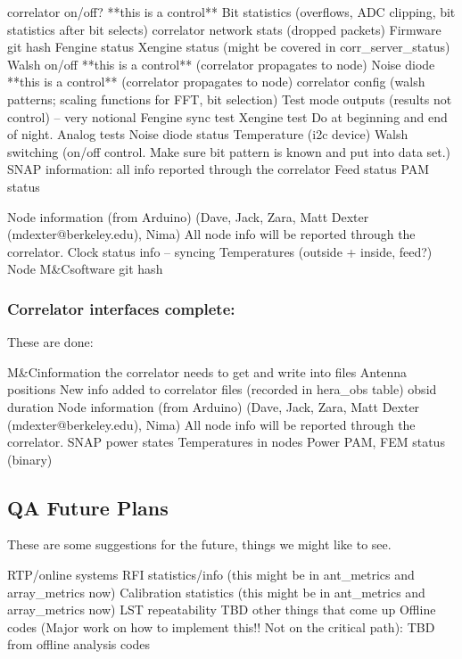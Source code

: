 \documentclass{article}
\newcommand{\mc}{M\&C}
\begin{document}
\begin{outline}[enumerate]
	\1 correlator on/off?	**this is a control**
	\1 Bit statistics (overflows, ADC clipping, bit statistics after bit selects)
	\1 correlator network stats (dropped packets)
	\1 Firmware git hash
	\1 Fengine status
	\1 Xengine status (might be covered in corr\_server\_status)
	\1 Walsh on/off	**this is a control** (correlator propagates to node)
	\1 Noise diode	**this is a control** (correlator propagates to node)
	\1 correlator config (walsh patterns; scaling functions for FFT, bit selection)
	\1 Test mode outputs (results not control) -- very notional
		\2 Fengine sync test
		\2 Xengine test
		\2 Do at beginning and end of night.
		\2 Analog tests
			\3 Noise diode status
			\3 Temperature (i2c device)
			\3 Walsh switching (on/off control. Make sure bit pattern is known and put into data set.)
	\1 SNAP information: all info reported through the correlator
		\2 Feed status
		\2 PAM status

	\1 Node information (from Arduino) (Dave, Jack, Zara, Matt Dexter (mdexter@berkeley.edu), Nima) All node info will be reported through the correlator.
		\2 Clock status info -- syncing
		\2 Temperatures (outside + inside, feed?)
		\2 Node \mc software git hash
\end{outline}

\subsubsection{Correlator interfaces complete:}
These are done:
\begin{outline}[enumerate]
	\1 \mc information the correlator needs to get and write into files
		\2 Antenna positions
	\1 New info added to correlator files (recorded in hera\_obs table)
		\2 obsid
		\2 duration
	\1 Node information (from Arduino) (Dave, Jack, Zara, Matt Dexter (mdexter@berkeley.edu), Nima) All node info will be reported through the correlator.
		\2 SNAP power states
		\2 Temperatures in nodes
		\2 Power PAM, FEM status (binary)
\end{outline}

\subsection{QA Future Plans}
\label{sec:qa_future}

These are some suggestions for the future, things we might like to see.

\begin{outline}[enumerate]
	\1 RTP/online systems
		\2 RFI statistics/info (this might be in ant\_metrics and array\_metrics now)
		\2 Calibration statistics (this might be in ant\_metrics and array\_metrics now)
		\2 LST repeatability
		\2 TBD other things that come up
	\1 Offline codes (Major work on how to implement this!! Not on the critical path):
		\2 TBD from offline analysis codes
\end{outline}
\end{document}
